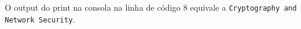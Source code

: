 \documentclass[12pt,varwidth=16cm,border=1pt]{standalone}
\begin{document}
O output do print na consola na linha de código 8 equivale a \verb+Cryptography and Network Security+.
\end{document}
